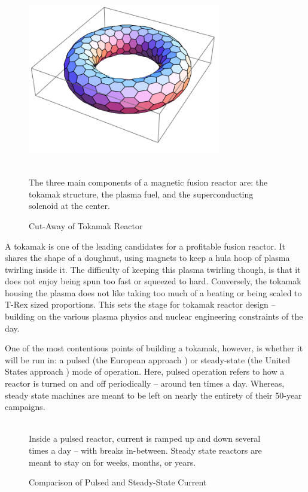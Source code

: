 \begin{figure}
	\centering
%		
	\includegraphics[width=0.75\textwidth]{images/test_image}
	\caption{Cut-Away of Tokamak Reactor} ~\\
	\small The three main components of a magnetic fusion reactor are: the tokamak structure, the plasma fuel, and the superconducting solenoid at the center.
\end{figure}

A tokamak is one of the leading candidates for a profitable fusion reactor. It shares the shape of a doughnut, using magnets to keep a hula hoop of plasma twirling inside it. The difficulty of keeping this plasma twirling though, is that it does not enjoy being spun too fast or squeezed to hard. Conversely, the tokamak housing the plasma does not like taking too much of a beating or being scaled to T-Rex sized proportions. This sets the stage for tokamak reactor design -- building on the various plasma physics and nuclear engineering constraints of the day. 

One of the most contentious points of building a tokamak, however, is whether it will be run in: a pulsed (the European approach \cite{eupulsed}) or steady-state (the United States approach \cite{ussteady}) mode of operation. Here, pulsed operation refers to how a reactor is turned on and off periodically -- around ten times a day. Whereas, steady state machines are meant to be left on nearly the entirety of their 50-year campaigns.

\begin{figure}
	\centering
	\begin{adjustbox}{width=0.75\textwidth}
		
	\end{adjustbox}
	\caption{Comparison of Pulsed and Steady-State Current} ~\\
	\small Inside a pulsed reactor, current is ramped up and down several times a day -- with breaks in-between. Steady state reactors are meant to stay on for weeks, months, or years.
\end{figure}

